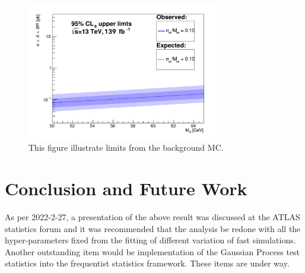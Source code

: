 \begin{figure}[!htb]
   \begin{center}
       \includegraphics[width=0.75\textwidth]{figures/chapter_dimuon/limits}
       \caption{
       This figure illustrate limits from the background MC.
	}
        \label{fig:limits}
   \end{center}
\end{figure}
\FloatBarrier

\section{Conclusion and Future Work}
As per 2022-2-27, a presentation of the above result was discussed at the ATLAS statistics forum and it was recommended that the analysis be redone with all the hyper-parameters fixed from the fitting of different variation of fast simulations. Another outstanding item would be implementation of the  Gaussian Process test statistics into the frequentist statistics framework. 
These items are under way.




